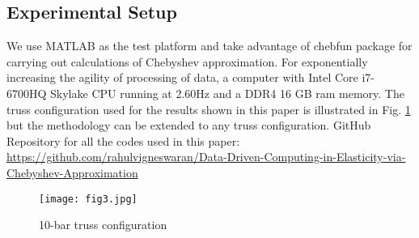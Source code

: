 \documentclass[conference]{IEEEtran}
\begin{document}
\subsection{Experimental Setup}
We use MATLAB as the test platform and take advantage of chebfun \cite{27} package for carrying out calculations of Chebyshev approximation. For exponentially increasing the agility of processing of data, a computer with Intel Core i7-6700HQ Skylake CPU running at 2.60Hz and a DDR4 16 GB ram memory. The truss configuration used for the results shown in this paper is illustrated in Fig. \ref{fig3} but the methodology can be extended to any truss configuration. GitHub Repository for all the codes used in this paper:  \href{https://github.com/rahulvigneswaran/Data-Driven-Computing-in-Elasticity-via-Chebyshev-Polynomial}{https://github.com/rahulvigneswaran/Data-Driven-Computing-in-Elasticity-via-Chebyshev-Approximation}

\begin{figure*}[hb]
\centering
{}
\caption{Obtained paths of equilibrium by varying load multiplier: (a) Method proposed in this paper; (b) Method proposed in \cite{26}.}
\label{fig5}
\end{figure*}

\begin{figure*}[hb]
\centering
{}
\caption{Solutions obtained for the load multiplier : (a) Method proposed in this paper; (b) Method proposed in \cite{26}.}
\label{fig6}
\end{figure*}

\begin{figure*}[hb]
\centering
{}
\caption{Obtained stress-strain pairs of member (A). (a) The proposed method and (b) Method from \cite{24} applied to the formulation in \cite{14}.  material data point,  obtained strain-stress pair.
}
\label{fig7}
\end{figure*}

\begin{figure}[htbp]
\centerline{\texttt{[image: fig3.jpg]}}
\caption{10-bar truss configuration \cite{26} }
\label{fig3}
\end{figure}
\end{document}
